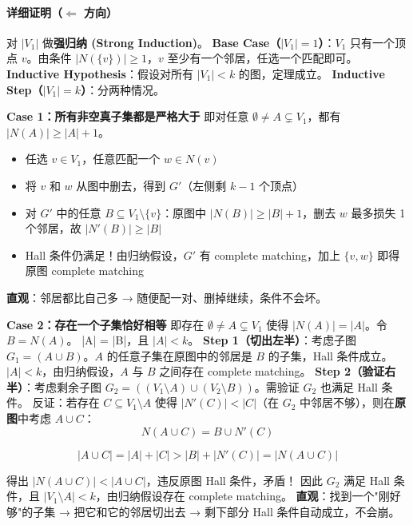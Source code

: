 \documentclass[10pt,a4paper,openany]{ctexbook}
\theoremstyle{definition}
\theoremstyle{remark}
\begin{document}
\paragraph{详细证明（$\Leftarrow$ 方向）}

对 $|V_1|$ 做\textbf{强归纳 (Strong Induction)}。
\textbf{Base Case（$|V_1| = 1$）}：$V_1$ 只有一个顶点 $v$。由条件 $|N(\{v\})| \ge 1$，$v$ 至少有一个邻居，任选一个匹配即可。
\textbf{Inductive Hypothesis}：假设对所有 $|V_1| < k$ 的图，定理成立。
\textbf{Inductive Step（$|V_1| = k$）}：分两种情况。
\vspace{-2pt}

\textbf{Case 1：所有非空真子集都是严格大于}
即对任意 $\emptyset \neq A \subsetneq V_1$，都有 $|N(A)| \ge |A| + 1$。
\begin{itemize}
\item 任选 $v \in V_1$，任意匹配一个 $w \in N(v)$
\item 将 $v$ 和 $w$ 从图中删去，得到 $G'$（左侧剩 $k-1$ 个顶点）
\item 对 $G'$ 中的任意 $B \subseteq V_1 \setminus \{v\}$：原图中 $|N(B)| \ge |B| + 1$，删去 $w$ 最多损失 1 个邻居，故 $|N'(B)| \ge |B|$
\item Hall 条件仍满足！由归纳假设，$G'$ 有 complete matching，加上 $\{v, w\}$ 即得原图 complete matching

\end{itemize}

\textbf{直观}：邻居都比自己多 → 随便配一对、删掉继续，条件不会坏。
\vspace{-2pt}

\textbf{Case 2：存在一个子集恰好相等}
即存在 $\emptyset \neq A \subsetneq V_1$ 使得 $|N(A)| = |A|$。令 $B = N(A)$。
|A| = |B|，且 $|A| < k$。
\textbf{Step 1（切出左半）}：考虑子图 $G_1 = (A \cup B)$。$A$ 的任意子集在原图中的邻居是 $B$ 的子集，Hall 条件成立。$|A| < k$，由归纳假设，$A$ 与 $B$ 之间存在 complete matching。
\textbf{Step 2（验证右半）}：考虑剩余子图 $G_2 = ((V_1 \setminus A) \cup (V_2 \setminus B))$。需验证 $G_2$ 也满足 Hall 条件。
反证：若存在 $C \subseteq V_1 \setminus A$ 使得 $|N'(C)| < |C|$（在 $G_2$ 中邻居不够），则在\textbf{原图}中考虑 $A \cup C$：
\[
N(A \cup C) = B \cup N'(C)
\]

\[
|A \cup C| = |A| + |C| > |B| + |N'(C)| = |N(A \cup C)|
\]

得出 $|N(A \cup C)| < |A \cup C|$，违反原图 Hall 条件，矛盾！
因此 $G_2$ 满足 Hall 条件，且 $|V_1 \setminus A| < k$，由归纳假设存在 complete matching。
\textbf{直观}：找到一个"刚好够"的子集 → 把它和它的邻居切出去 → 剩下部分 Hall 条件自动成立，不会崩。
\vspace{-2pt}
\end{document}
